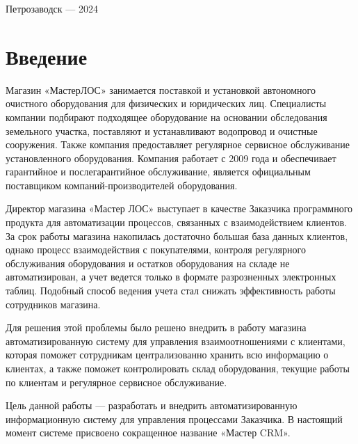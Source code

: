 \documentclass[a4paper,12pt]{article}
\begin{document}
\vfill

\begin{center}
\large
    Петрозаводск --- 2024
\end{center}




\newpage

\tableofcontents




\newpage
\section*{Введение}
Магазин «МастерЛОС» занимается поставкой и установкой автономного очистного оборудования для физических и юридических лиц. Специалисты компании подбирают подходящее оборудование на основании обследования земельного участка, поставляют и устанавливают водопровод и очистные сооружения. Также компания предоставляет регулярное сервисное обслуживание установленного оборудования. Компания работает с 2009 года и обеспечивает гарантийное и послегарантийное обслуживание, является официальным поставщиком компаний-производителей оборудования.

Директор магазина «Мастер ЛОС» выступает в качестве Заказчика программного продукта для автоматизации процессов, связанных с взаимодействием клиентов. За срок работы магазина накопилась достаточно большая база данных клиентов, однако процесс взаимодействия с покупателями, контроля регулярного обслуживания оборудования и остатков оборудования на складе не автоматизирован, а учет ведется только в формате разрозненных электронных таблиц. Подобный способ ведения учета стал снижать эффективность работы сотрудников магазина.

Для решения этой проблемы было решено внедрить в работу магазина автоматизированную систему для управления взаимоотношениями с клиентами, которая поможет сотрудникам централизованно хранить всю информацию о клиентах, а также поможет контролировать склад оборудования, текущие работы по клиентам и регулярное сервисное обслуживание.

Цель данной работы --- разработать и внедрить автоматизированную информационную систему для управления процессами Заказчика. В настоящий момент системе присвоено сокращенное название «Мастер CRM».
\end{document}

